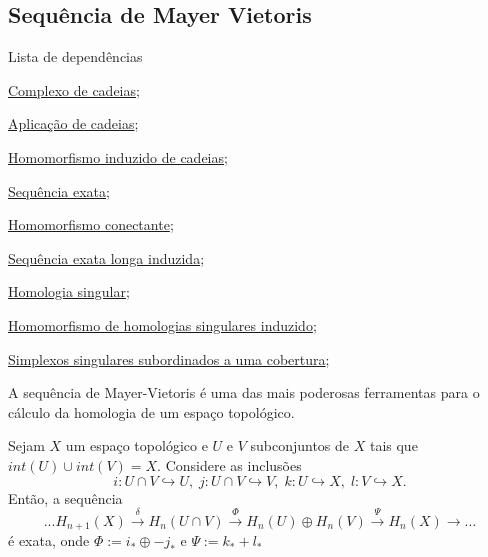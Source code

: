 \subsection{Sequência de Mayer Vietoris} %
\label{sequencia-de-mayer-vietoris-prop}
\begin{titlemize}{Lista de dependências}
	\item \hyperref[complexo-de-cadeias-def]{Complexo de cadeias};\\ 
    \item \hyperref[aplicacao-de-cadeias-def]{Aplicação de cadeias};\\
    \item \hyperref[homomorfismo-induzido-de-cadeias-prop]{Homomorfismo induzido de cadeias};\\
    \item \hyperref[sequencia-exata-def]{Sequência exata};\\
    \item \hyperref[homomorfismo-conectante-def]{Homomorfismo conectante};\\
    \item \hyperref[sequencia-exata-longa-induzida-prop]{Sequência exata longa induzida};\\
    \item \hyperref[homologia-singular-def]{Homologia singular};\\
    \item \hyperref[homomorfismo-de-homologias-singulares-induzido-prop]{Homomorfismo de homologias singulares induzido};\\
    \item \hyperref[simplexos-singulares-subordinados-a-uma-cobertura-def]{Simplexos singulares subordinados a uma cobertura};\\
    
\end{titlemize}

A sequência de Mayer-Vietoris é uma das mais poderosas ferramentas para o cálculo da homologia de um espaço topológico.
\begin{thm}
    Sejam $X$ um espaço topológico e $U$ e $V$ subconjuntos de $X$ tais que $int(U)\cup int(V)=X$. Considere as inclusões 
    \[i:U\cap V\hookrightarrow U,\;j:U\cap V\hookrightarrow V,\;k:U\hookrightarrow X,\;l:V\hookrightarrow X.\]
    Então, a sequência 
    \[...H_{n+1}(X)\xrightarrow{\delta} H_n(U\cap V)\xrightarrow{\Phi}H_n(U)\oplus H_n(V)\xrightarrow{\Psi} H_n(X)\rightarrow ...\]
    é exata, onde $\Phi:=i_*\oplus-j_*$ e $\Psi:=k_*+l_*$ 
\end{thm}

